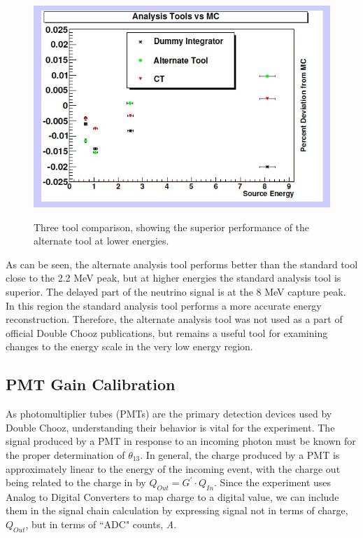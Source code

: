 \begin{figure}
\caption{Three tool comparison, showing the superior performance of the alternate tool at lower energies.}
\includegraphics[width=\textwidth]{DC_Results/Ana_Tool_Comp}
\label{Three Tool Comparison}
\end{figure}


As can be seen, the alternate analysis tool performs better than the standard tool close to the 2.2 MeV peak, but at higher energies the standard analysis tool is superior. The delayed part of the neutrino signal is at the 8 MeV capture peak. In this region the standard analysis tool performs a more accurate energy reconstruction. Therefore, the alternate analysis tool was not used as a part of official Double Chooz publications, but remains a useful tool for examining changes to the energy scale in the very low energy region.   

\subsection{PMT Gain Calibration}
\label{sec:PMT_Calibration}
As photomultiplier tubes (PMTs) are the primary detection devices used by Double Chooz, understanding their behavior is vital for the experiment. The signal produced by a PMT in response to an incoming photon must be known for the proper determination of $\theta_{13}$.  In general, the charge produced by a PMT is approximately linear to the energy of the incoming event, with the charge out being related to the charge in by $Q_{Out}= G^{\prime} \cdot Q_{In}$. Since the experiment uses Analog to Digital Converters to map charge to a digital value, we can include them in the signal chain calculation by expressing signal not in terms of  charge, $Q_{Out}$, but in terms of ``ADC" counts, {\it A}. 

